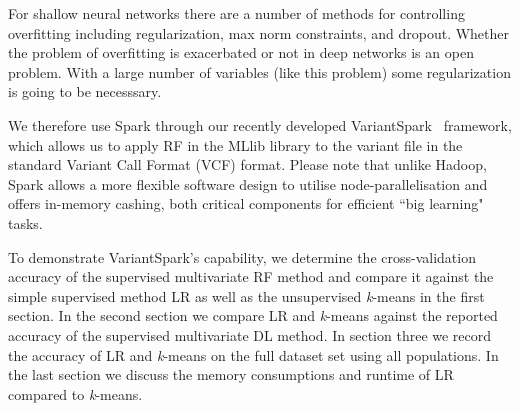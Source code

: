 \documentclass{llncs}
\newcommand{\variantSpark}{{\sc VariantSpark}}
\newcommand{\kMeans}{\textit{k}-means}
\begin{document}
{For shallow neural networks there are a number of methods for controlling overfitting including regularization, max norm
constraints, and dropout. Whether the problem of overfitting is exacerbated or not in deep networks is an open problem.
With a large number of variables (like this problem) some regularization is going to be necesssary. 


We therefore use {\sc Spark} through our recently developed \variantSpark~\cite{OBrien} framework, which allows us to
apply RF in the {\sc MLlib} library to the variant file in the standard Variant Call Format (VCF) format.  Please note
that unlike {\sc Hadoop}, {\sc Spark} allows a more flexible software design to utilise node-parallelisation and offers
in-memory cashing, both critical components for efficient ``big learning" tasks.

To demonstrate \variantSpark's capability, we determine the cross-validation accuracy of the supervised multivariate RF
method and compare it against the simple supervised method LR as well as the unsupervised \kMeans{} in the first
section.  In the second section we compare LR and \kMeans{} against the reported accuracy of the supervised multivariate
DL method.  In section three we record the accuracy of LR and \kMeans{} on the full dataset set using all populations.
In the last section we discuss the memory consumptions and runtime of LR compared to \kMeans{}.


}
\end{document}
